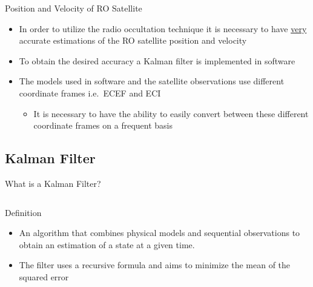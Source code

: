 \documentclass[10pt,aspectratio=169]{beamer}
\begin{document}
\begin{frame}{Position and Velocity of RO Satellite}
    \begin{itemize}
        \item In order to utilize the radio occultation technique it is necessary to have \underline{very} accurate estimations of the RO satellite position and velocity
        \item To obtain the desired accuracy a Kalman filter is implemented in software
        \item The models used in software and the satellite observations use different coordinate frames i.e.\ ECEF and ECI
            \begin{itemize}
                \item It is necessary to have the ability to easily convert between these different coordinate frames on a frequent basis
            \end{itemize}
    \end{itemize}
\end{frame}

\subsection{Kalman Filter}
    \begin{frame}{What is a Kalman Filter?}
        \begin{columns}
            \begin{column}{0.9\textwidth}
                \begin{block}{Definition}
                    \begin{itemize}
                        \item An algorithm that combines physical models and sequential observations to obtain an estimation of a state at a given time.
                        \item The filter uses a recursive formula and aims to minimize the mean of the squared error \cite{welch:1995}
                    \end{itemize}
                \end{block}
            \end{column}
        \end{columns}
    \end{frame}
\end{document}
